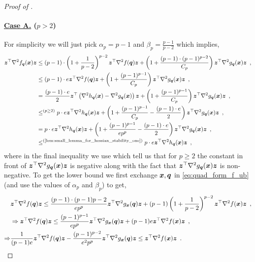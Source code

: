 \begin{proof}[Proof of ]
    \paragraph{\underline{Case A.} ($p>2$)} For simplicity we will just pick $\alpha_p = p-1$ and $\beta_p = \frac{p-1}{p-2}$ which implies,
    \begin{align*}
        \vz^{\top}\nabla^2f_{\vq}(\vx)\vz &\leq (p-1)\cdot\left(1 + \frac{1}{p-2}\right)^{p-2}\vz^{\top}\nabla^2f(\vq)\vz + \left(1+\frac{(p-1)\cdot (p-1)^{p-2}}{C_p}\right) \vz^{\top}\nabla^2g_{\vq}(\vx)\vz\enspace,\\
        &\leq (p-1)\cdot e\vz^{\top}\nabla^2f(\vq)\vz + \left(1+\frac{(p-1)^{p-1}}{C_p}\right) \vz^{\top}\nabla^2g_{\vq}(\vx)\vz\enspace,\\
        &= \frac{(p-1)\cdot e}{2} \vz^{\top}\left(\nabla^2h_{\vq}(\vx) - \nabla^2g_{\vq}(\vx)\right)\vz + \left(1+\frac{(p-1)^{p-1}}{C_p}\right) \vz^{\top}\nabla^2g_{\vq}(\vx)\vz\enspace,\\
        &\leq^{(p\geq 2)} p\cdot e \vz^{\top}\nabla^2h_{\vq}(\vx)\vz + \left(1+\frac{(p-1)^{p-1}}{C_p} - \frac{(p-1)\cdot e}{2}\right)\vz^{\top}\nabla^2g_{\vq}(\vx)\vz\enspace,\\
        &= p\cdot e \vz^{\top}\nabla^2h_{\vq}(\vx)\vz + \left(1+\frac{(p-1)^{p-1}}{ep^p} - \frac{(p-1)\cdot e}{2}\right)\vz^{\top}\nabla^2g_{\vq}(\vx)\vz\enspace,\\
        &\leq^{\text{(\Cref{lem:small_lemma_for_hessian_stability_one})}} p\cdot e \vz^{\top}\nabla^2h_{\vq}(\vx)\vz\enspace,
    \end{align*}
    where in the final inequality we use  which tell us that for $p\geq 2$ the constant in front of $\bm{z}^{\top}\nabla^2g_{\bm{q}}(\bm{x})\bm{z}$ is negative along with the fact that $\bm{z}^{\top}\nabla^2g_{\bm{q}}(\bm{x})\bm{z}$ is non-negative. To get the lower bound we first exchange $\bm{x}, \bm{q}$ in \eqref{eq:quad_form_f_ub} (and use the values of $\alpha_p$ and $\beta_p$) to get,
    \begin{align*}
        &\vz^{\top}\nabla^2f(\vq)\vz \leq \frac{(p-1)\cdot(p-1){p-2}}{ep^p}\vz^{\top}\nabla^2g_{\vx}(\vq)\vz + (p-1)\left(1 + \frac{1}{p-2}\right)^{p-2}\vz^{\top}\nabla^2f(\vx)\vz\enspace,\\
        &\Rightarrow \vz^{\top}\nabla^2f(\vq)\vz \leq \frac{(p-1)^{p-1}}{ep^p}\vz^{\top}\nabla^2g_{\vx}(\vq)\vz + (p-1)e\vz^{\top}\nabla^2f(\vx)\vz\enspace,\\
        \Rightarrow &\frac{1}{(p-1)e}\vz^{\top}\nabla^2f(\vq)\vz - \frac{(p-1)^{p-2}}{e^2p^p}\vz^{\top}\nabla^2g_{\vx}(\vq)\vz \leq \vz^{\top}\nabla^2f(\vx)\vz\enspace.

\end{align*}
\end{proof}
